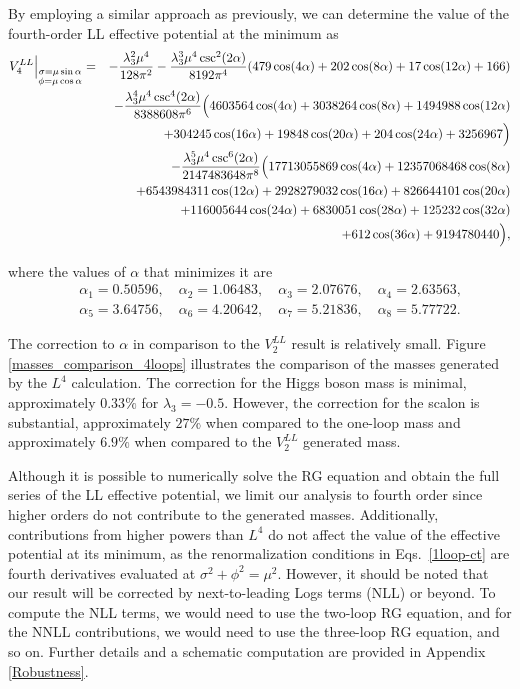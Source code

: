 \documentclass[11pt,a4paper,english,superscriptaddress,preprint,aps,prd]{revtex4}
\begin{document}
By employing a similar approach as previously, we can determine the value of the fourth-order LL effective potential at the minimum as
\begin{eqnarray}
 V^{LL}_{4}\Big{|}_{\substack{\sigma=\mu\sin\alpha\\ \phi=\mu\cos\alpha}}&=&-\frac{\lambda_3^2 \mu ^4}{128 \pi ^2}-\frac{\lambda_3^3 \mu ^4 \csc ^2(2 \alpha )}{8192 \pi ^4}(479 \cos (4 \alpha )+202 \cos (8 \alpha )+17 \cos (12 \alpha )+166)\nonumber\\
 &&-\frac{\lambda_3^4 \mu ^4\csc ^4(2 \alpha )}{8388608 \pi ^6}\Bigr(4603564 \cos (4 \alpha )+3038264 \cos (8 \alpha )+1494988 \cos (12 \alpha )\nonumber\\
 && +304245 \cos (16 \alpha ) +19848 \cos (20 \alpha )+204 \cos (24 \alpha )+3256967\Bigr)\nonumber\\
 &&
 -\frac{\lambda_3^5 \mu ^4\csc ^6(2 \alpha )}{2147483648 \pi ^8}\Bigr(17713055869 \cos (4 \alpha ) +12357068468 \cos (8 \alpha )\nonumber\\
 &&+6543984311 \cos (12 \alpha )
  +2928279032 \cos (16 \alpha )+826644101 \cos (20 \alpha )\nonumber\\
 &&+116005644 \cos (24 \alpha )+6830051 \cos (28 \alpha )+125232 \cos (32 \alpha )\nonumber\\
 && +612 \cos (36 \alpha ) +9194780440\Bigr),
\end{eqnarray}

\noindent where the values of $\alpha$ that minimizes it are
\begin{eqnarray*}
 &&\alpha_1 =0.50596,\quad \alpha_2 =1.06483,\quad \alpha_3 =2.07676,\quad \alpha_4 =2.63563,\nonumber\\
 && \alpha_5 =3.64756,\quad \alpha_6 =4.20642,\quad \alpha_7 =5.21836,\quad \alpha_8 =5.77722.
\end{eqnarray*}

The correction to $\alpha$ in comparison to the $V^{LL}_{2}$ result is relatively small. Figure \ref{masses_comparison_4loops} illustrates the comparison of the masses generated by the $L^4$ calculation. The correction for the Higgs boson mass is minimal, approximately $0.33\%$ for $\lambda_3=-0.5$. However, the correction for the scalon is substantial, approximately $27\%$ when compared to the one-loop mass and approximately $6.9\%$ when compared to the $V^{LL}_{2}$ generated mass.

{Although it is possible to numerically solve the RG equation and obtain the full series of the LL effective potential, we limit our analysis to fourth order since higher orders do not contribute to the generated masses. Additionally, contributions from higher powers than $L^4$ do not affect the value of the effective potential at its minimum, as the renormalization conditions in Eqs.~\eqref{1loop-ct} are fourth derivatives evaluated at $\sigma^2+\phi^2=\mu^2$. However, it should be noted that our result will be corrected by next-to-leading Logs terms (NLL) or beyond. To compute the NLL terms, we would need to use the two-loop RG equation, and for the NNLL contributions, we would need to use the three-loop RG equation, and so on. Further details and a schematic computation are provided in Appendix \ref{Robustness}.}
\end{document}
